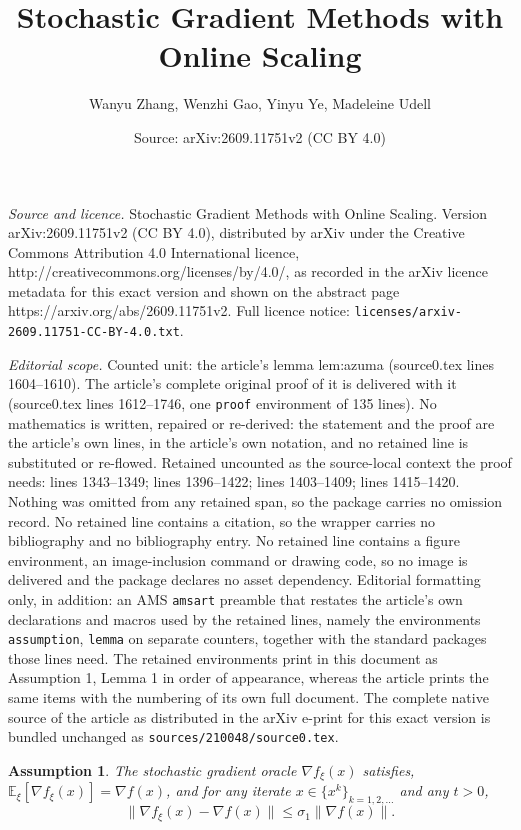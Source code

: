 \documentclass[10pt,a4paper]{amsart}
\title{Stochastic Gradient Methods with Online Scaling}
\author{Wanyu Zhang, Wenzhi Gao, Yinyu Ye, Madeleine Udell}
\date{Source: arXiv:2609.11751v2 (CC BY 4.0)}
\newtheorem{assumption}{Assumption}
\begin{document}
\maketitle

\noindent\emph{Source and licence.} Stochastic Gradient Methods with Online Scaling. Version arXiv:2609.11751v2 (CC BY 4.0), distributed by arXiv under the Creative Commons Attribution 4.0 International licence, http://creativecommons.org/licenses/by/4.0/, as recorded in the arXiv licence metadata for this exact version and shown on the abstract page https://arxiv.org/abs/2609.11751v2. Full licence notice: \texttt{licenses/arxiv-2609.11751-CC-BY-4.0.txt}.\par\smallskip

\noindent\textit{Editorial scope.} Counted unit: the article's lemma lem:azuma (source0.tex lines 1604--1610). The article's complete original proof of it is delivered with it (source0.tex lines 1612--1746, one \texttt{proof} environment of 135 lines). No mathematics is written, repaired or re-derived: the statement and the proof are the article's own lines, in the article's own notation, and no retained line is substituted or re-flowed.  Retained uncounted as the source-local context the proof needs: lines 1343--1349; lines 1396--1422; lines 1403--1409; lines 1415--1420.  Nothing was omitted from any retained span, so the package carries no omission record.  No retained line contains a citation, so the wrapper carries no bibliography and no bibliography entry.  No retained line contains a figure environment, an image-inclusion command or drawing code, so no image is delivered and the package declares no asset dependency.  Editorial formatting only, in addition: an AMS \texttt{amsart} preamble that restates the article's own declarations and macros used by the retained lines, namely the environments \texttt{assumption}, \texttt{lemma} on separate counters, together with the standard packages those lines need.  The retained environments print in this document as Assumption 1, Lemma 1 in order of appearance, whereas the article prints the same items with the numbering of its own full document.  The complete native source of the article as distributed in the arXiv e-print for this exact version is bundled unchanged as \texttt{sources/210048/source0.tex}.
\begin{assumption}
  \label{as:bound-g-dtm}
  The stochastic gradient oracle $\nabla f_{\xi} (x)$ satisfies, $\mathbb{E}_{\xi} [\nabla f_{\xi} (x)]={\nabla}f (x)$, and for any iterate $x \in \{ x^k \}_{k = 1, 2, \ldots}$ and any $t > 0$,
    \begin{equation*}
    \| \nabla f_{\xi} (x) - \nabla f (x) \| \leq \sigma_1 \| \nabla f (x) \|.
    \end{equation*}
\end{assumption}
\end{document}
